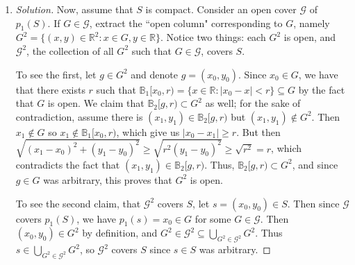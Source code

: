 \documentclass{article}
\newcommand{\N}{{\mathbb N}}
\newcommand{\R}{{\mathbb R}}
\begin{document}
\begin{enumerate}
\begin{proof}[Solution]
		We now prove that $p_1(S)$ is not closed.
		Note that $p_1(S) = \{2^{-n} \colon n \in \N\}$.
		See that $0 \in p_1(S)'$ but $0 \not\in p_1(S)$.
		The second of these is obvious, $0 < 2^{-n}$ for all $n \in \N$.
		To see that $0$ is a limit point,
		we have $\lim_{n\to\infty} 2^{-n} = 0$ (obviously, we are in $\R$),
		and $2^{-n} \in p_1(S)$ are distinct points,
		thus $0 \in p_1(S)'$ (by our proposition in metric spaces).
		Thus, $p_1(S) \neq p_1(S) \cup p_1(S)' = \overline{p_1(S)}$.
		But this is true only if $p_1(S)$ is not closed.
		Hence, $S$ is closed but $p_1(S)$ is not closed.
	\end{proof}
	\item \begin{proof}[Solution]\let\qed\relax
		Now, assume that $S$ is compact.
		Consider an open cover $\mathcal{G}$ of $p_1(S)$.
		If $G \in \mathcal{G}$, extract the ``open column" corresponding
		to $G$, namely $G^2 = \{(x,y) \in \R^2 \colon x \in G, y \in \R\}$.
		Notice two things:
		each $G^2$ is open, and
		$\mathcal{G}^2$, the collection of all $G^2$ such that $G \in \mathcal{G}$,
		covers $S$.

		To see the first, let $g \in G^2$ and denote $g = (x_0, y_0)$.
		Since $x_0 \in G$, we have that there exists $r$
		such that $\mathbb{B}_1[x_0,r) = \{x \in \R \colon |x_0-x|<r\} \subseteq G$
		by the fact that $G$ is open.
		We claim that $\mathbb{B}_2[g,r) \subset G^2$ as well;
		for the sake of contradiction, assume there is
		$(x_1,y_1) \in \mathbb{B}_2[g,r)$ but $(x_1,y_1) \not\in G^2$.
		Then $x_1 \not\in G$ so $x_1 \not\in \mathbb{B}_1[x_0,r)$,
		which give us $|x_0 - x_1| \geq r$.
		But then $\sqrt{(x_1-x_0)^2 + (y_1 - y_0)^2} \geq \sqrt{r^2 (y_1 - y_0)^2}
		\geq \sqrt{r^2} = r$,
		which contradicts the fact that $(x_1,y_1) \in \mathbb{B}_2[g,r)$.
		Thus, $\mathbb{B}_2[g,r) \subset G^2$,
		and since $g \in G$ was arbitrary, this proves that $G^2$ is open.
		
		To see the second claim, that $\mathcal{G}^2$ covers $S$,
		let $s = (x_0,y_0) \in S$.
		Then since $\mathcal{G}$ covers $p_1(S)$,
		we have $p_1(s) = x_0 \in G$ for some $G \in \mathcal{G}$.
		Then $(x_0,y_0) \in G^2$ by definition,
		and $G^2 \in \mathcal{G}^2 \subseteq \bigcup_{G^2 \in \mathcal{G}^2} G^2$.
		Thus $s \in \bigcup_{G^2 \in \mathcal{G}^2} G^2$,
		so $\mathcal{G}^2$ covers $S$ since $s \in S$ was arbitrary.


\end{proof}
\end{enumerate}
\end{document}
